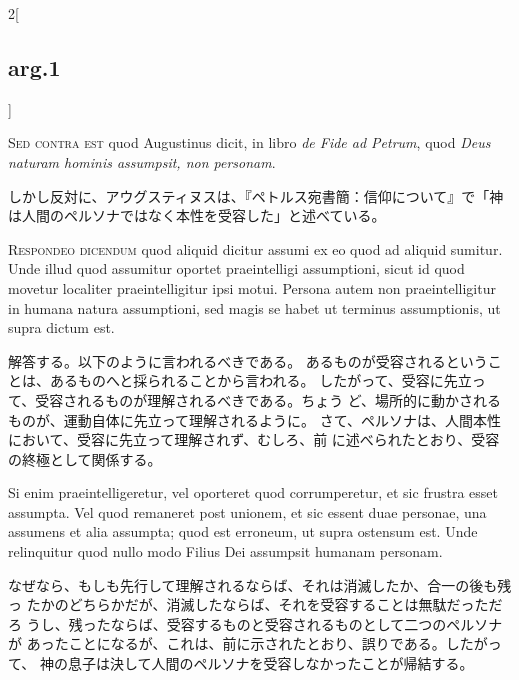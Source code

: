 \documentclass[paper=a4paper,fontsize=10pt,jafontsize=9pt,titlepage]{jlreq}
\begin{document}
\begin{paracol}{2}[\subsection{arg.1}]
\switchcolumn*[\subsection{s.c.}]

{\scshape Sed contra est} quod Augustinus dicit, in libro {\itshape de Fide ad Petrum}, quod
{\itshape Deus naturam hominis assumpsit, non personam}.

\switchcolumn

しかし反対に、アウグスティヌスは、『ペトルス宛書簡：信仰について』で「神
 は人間のペルソナではなく本性を受容した」と述べている。


{\scshape Respondeo dicendum} quod aliquid dicitur assumi ex eo quod ad aliquid
sumitur. Unde illud quod assumitur oportet praeintelligi assumptioni,
sicut id quod movetur localiter praeintelligitur ipsi motui. Persona
autem non praeintelligitur in humana natura assumptioni, sed magis se
habet ut terminus assumptionis, ut supra dictum est.

\switchcolumn

解答する。以下のように言われるべきである。
あるものが受容されるということは、あるものへと採られることから言われる。
したがって、受容に先立って、受容されるものが理解されるべきである。ちょう
 ど、場所的に動かされるものが、運動自体に先立って理解されるように。
さて、ペルソナは、人間本性において、受容に先立って理解されず、むしろ、前
 に述べられたとおり、受容の終極として関係する。

\switchcolumn*

Si enim
praeintelligeretur, vel oporteret quod corrumperetur, et sic frustra
esset assumpta. Vel quod remaneret post unionem, et sic essent duae
personae, una assumens et alia assumpta; quod est erroneum, ut supra
ostensum est. Unde relinquitur quod nullo modo Filius Dei assumpsit
humanam personam.

\switchcolumn

なぜなら、もしも先行して理解されるならば、それは消滅したか、合一の後も残っ
 たかのどちらかだが、消滅したならば、それを受容することは無駄だっただろ
 うし、残ったならば、受容するものと受容されるものとして二つのペルソナが
 あったことになるが、これは、前に示されたとおり、誤りである。したがって、
 神の息子は決して人間のペルソナを受容しなかったことが帰結する。

\switchcolumn*[\subsection{ad.1}]


\end{paracol}
\end{document}
